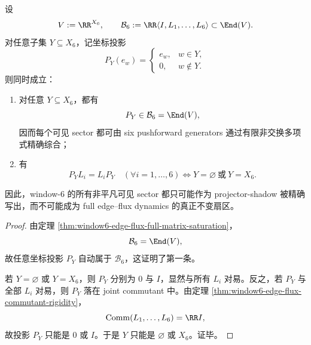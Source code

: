 \begin{theorem}[精确可综合扇区与动力学不变扇区的严格分离]\label{thm:conclusion-window6-projector-synthesis-dynamical-sector-separation}
设
\[
V:=\RR^{X_6},
\qquad
\mathcal B_6:=\RR\langle I,L_1,\dots,L_6\rangle\subset \End(V).
\]
对任意子集 \(Y\subseteq X_6\)，记坐标投影
\[
P_Y(e_w)=
\begin{cases}
e_w,& w\in Y,\\
0,& w\notin Y.
\end{cases}
\]
则同时成立：
\begin{enumerate}
  \item 对任意 \(Y\subseteq X_6\)，都有
  \[
  P_Y\in \mathcal B_6=\End(V),
  \]
  因而每个可见 sector 都可由 six pushforward generators 通过有限非交换多项式精确综合；
  \item 有
  \[
  P_YL_i=L_iP_Y\quad (\forall i=1,\dots,6)
  \iff
  Y=\varnothing\ \text{或}\ Y=X_6.
  \]
\end{enumerate}
因此，window-\(6\) 的所有非平凡可见 sector 都只可能作为 projector-shadow 被精确写出，而不可能成为 full edge--flux dynamics 的真正不变扇区。
\end{theorem}
\begin{proof}
由定理 \ref{thm:window6-edge-flux-full-matrix-saturation}，
\[
\mathcal B_6=\End(V),
\]
故任意坐标投影 \(P_Y\) 自动属于 \(\mathcal B_6\)，这证明了第一条。

若 \(Y=\varnothing\) 或 \(Y=X_6\)，则 \(P_Y\) 分别为 \(0\) 与 \(I\)，显然与所有 \(L_i\) 对易。反之，若 \(P_Y\) 与全部 \(L_i\) 对易，则 \(P_Y\) 落在 joint commutant 中。由定理 \ref{thm:window6-edge-flux-commutant-rigidity}，
\[
\operatorname{Comm}(L_1,\dots,L_6)=\RR I,
\]
故投影 \(P_Y\) 只能是 \(0\) 或 \(I\)。于是 \(Y\) 只能是 \(\varnothing\) 或 \(X_6\)。证毕。
\end{proof}

